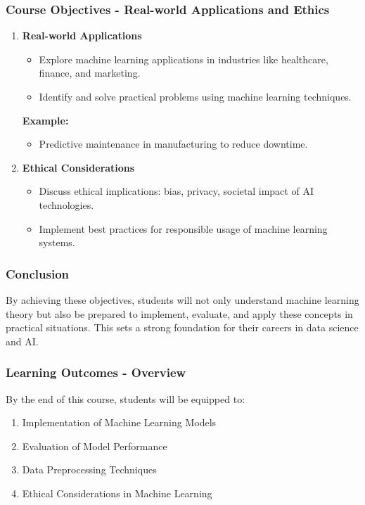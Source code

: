 \documentclass[aspectratio=169]{beamer}
\begin{document}
\begin{frame}
    \frametitle{Course Objectives - Real-world Applications and Ethics}
    \begin{enumerate}[resume]
        \item \textbf{Real-world Applications}
            \begin{itemize}
                \item Explore machine learning applications in industries like healthcare, finance, and marketing.
                \item Identify and solve practical problems using machine learning techniques.
            \end{itemize}
            
            \textbf{Example:}
            \begin{itemize}
                \item Predictive maintenance in manufacturing to reduce downtime.
            \end{itemize}

        \item \textbf{Ethical Considerations}
            \begin{itemize}
                \item Discuss ethical implications: bias, privacy, societal impact of AI technologies.
                \item Implement best practices for responsible usage of machine learning systems.
            \end{itemize}
    \end{enumerate}
\end{frame}

\begin{frame}
    \frametitle{Conclusion}
    By achieving these objectives, students will not only understand machine learning theory but also be prepared to implement, evaluate, and apply these concepts in practical situations. This sets a strong foundation for their careers in data science and AI.
\end{frame}

\begin{frame}[fragile]
    \frametitle{Learning Outcomes - Overview}
    By the end of this course, students will be equipped to:
    \begin{enumerate}
        \item Implementation of Machine Learning Models
        \item Evaluation of Model Performance
        \item Data Preprocessing Techniques
        \item Ethical Considerations in Machine Learning
    \end{enumerate}
\end{frame}
\end{document}
